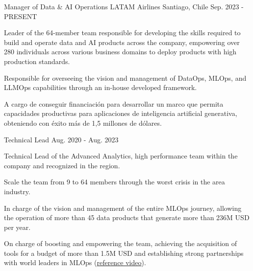 

\begin{cventries}
  \cventry
    {Manager of Data \& AI Operations} %
    {LATAM Airlines} %
    {Santiago, Chile} %
    {Sep. 2023 - PRESENT} %
    {
      \begin{cvitems} %
        \item {Leader of the 64-member team responsible for developing the skills required to build and operate data and AI products across the company, empowering over 280 individuals across various business domains to deploy products with high production standards.}
        \item {Responsible for overseeing the vision and management of DataOps, MLOps, and LLMOps capabilities through an in-house developed framework.}
        \item {A cargo de conseguir financiación para desarrollar un marco que permita capacidades productivas para aplicaciones de inteligencia artificial generativa, obteniendo con éxito más de 1,5 millones de dólares.}
      \end{cvitems}
    }
  \cventry
    {Technical Lead} %
    {} %
    {} %
    {Aug. 2020 - Aug. 2023} %
    {
      \begin{cvitems} %
        \item {Technical Lead of the Advanced Analytics, high performance team within the company and recognized in the region. }
        \item {Scale the team from 9 to 64 members through the worst crisis in the area industry.}
        \item {In charge of the vision and management of the entire MLOps journey, allowing the operation of more than 45 data products that generate more than 236M USD per year.}
        \item {On charge of boosting and empowering the team, achieving the acquisition of tools for a budget of more than 1.5M USD and establishing strong partnerships with world leaders in MLOps (\href{https://youtu.be/kagDKNto1c4}{reference video}).}

\end{cvitems}}
\end{cventries}
